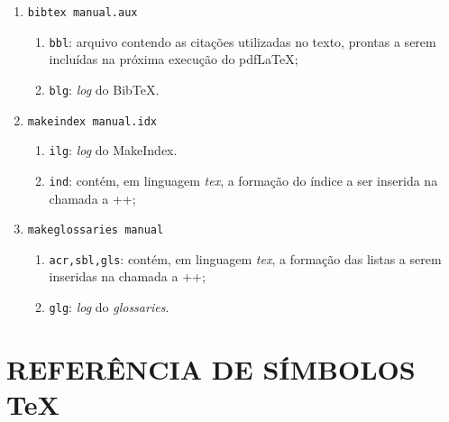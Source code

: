 \documentclass[xindy,rascunho]{fei}
\begin{document}
\begin{teorema}
\begin{enumerate}
	\item\verb+bibtex manual.aux+
	\begin{enumerate}
	\item \texttt{bbl}: arquivo contendo as citações utilizadas no texto, prontas a serem incluídas na próxima execução do pdf\LaTeX;
	\item \texttt{blg}: \emph{log} do Bib\TeX.
	\end{enumerate}	
	
	\item\verb+makeindex manual.idx+
	\begin{enumerate}
	\item \texttt{ilg}: \emph{log} do MakeIndex.
	\item \texttt{ind}: contém, em linguagem \emph{tex}, a formação do índice a ser inserida na chamada a \latexinline+\printindex+;
	\end{enumerate}	
	
	\item\verb+makeglossaries manual+
	\begin{enumerate}
	\item \texttt{acr,sbl,gls}:  contém, em linguagem \emph{tex}, a formação das listas a serem inseridas na chamada a \latexinline+\printglossaries+;
	\item \texttt{glg}: \emph{log} do \emph{glossaries}.
	\end{enumerate}
	\end{enumerate}
	
	\chapter{REFERÊNCIA DE SÍMBOLOS \TeX{}} \label{chap:simbolos}


\end{teorema}
\end{document}
